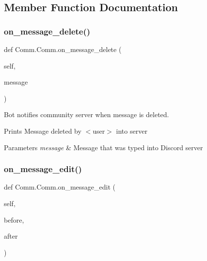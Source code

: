 \subsection{Member Function Documentation}
\mbox{\label{class_comm_1_1_comm_ae68aa6861ade9320962ae25bbcd82885}} 
\subsubsection{\texorpdfstring{on\+\_\+message\+\_\+delete()}{on\_message\_delete()}}
{\footnotesize\ttfamily def Comm.\+Comm.\+on\+\_\+message\+\_\+delete (\begin{DoxyParamCaption}\item[{}]{self,  }\item[{}]{message }\end{DoxyParamCaption})}



Bot notifies community server when message is deleted. 

Prints \textquotesingle{}Message deleted by $<$user$>$\textquotesingle{} into server 
\begin{DoxyParams}{Parameters}
{\em message} & Message that was typed into Discord server \\
\hline
\end{DoxyParams}
\mbox{\label{class_comm_1_1_comm_a899c1f36041c59c1cf6e0529f468ba11}} 
\subsubsection{\texorpdfstring{on\+\_\+message\+\_\+edit()}{on\_message\_edit()}}
{\footnotesize\ttfamily def Comm.\+Comm.\+on\+\_\+message\+\_\+edit (\begin{DoxyParamCaption}\item[{}]{self,  }\item[{}]{before,  }\item[{}]{after }\end{DoxyParamCaption})}



